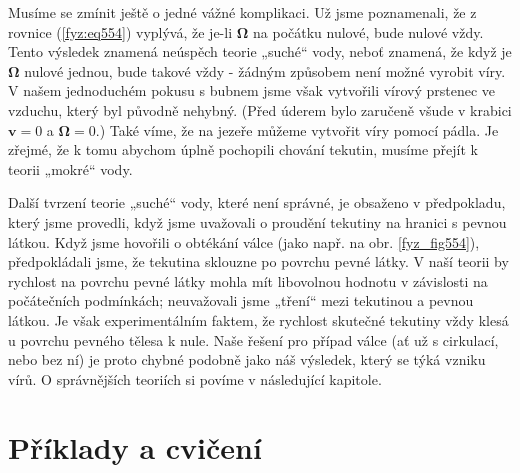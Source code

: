 {    Musíme se zmínit ještě o jedné vážné komplikaci. Už jsme poznamenali, že z rovnice 
    (\ref{fyz:eq554}) vyplývá, že je-li \(\symbf{\Omega}\) na počátku nulové, bude nulové vždy. 
    Tento výsledek znamená neúspěch teorie „suché“ vody, neboť znamená, že když je 
    \(\symbf{\Omega}\) nulové jednou, bude takové vždy - žádným způsobem není možné vyrobit víry. V 
    našem jednoduchém pokusu s bubnem jsme však vytvořili vírový prstenec ve vzduchu, který byl 
    původně nehybný. (Před úderem bylo zaručeně všude v krabici \(\bm{v} = 0\) a 
    \(\symbf{\Omega}=0\).) Také víme, že na jezeře můžeme vytvořit víry pomocí pádla. Je zřejmé, že 
    k tomu abychom úplně pochopili chování tekutin, musíme přejít k teorii „mokré“ vody.
    
    Další tvrzení teorie „suché“ vody, které není správné, je obsaženo v předpokladu, který jsme 
    provedli, když jsme uvažovali o proudění tekutiny na hranici s pevnou látkou. Když jsme 
    hovořili o obtékání válce (jako např. na obr. \ref{fyz_fig554}), předpokládali jsme, že 
    tekutina sklouzne po povrchu pevné látky. V naší teorii by rychlost na povrchu pevné látky 
    mohla mít libovolnou hodnotu v závislosti na počátečních podmínkách; neuvažovali jsme „tření“ 
    mezi tekutinou a pevnou látkou. Je však experimentálním faktem, že rychlost skutečné tekutiny 
    vždy klesá u povrchu pevného tělesa k nule. Naše řešení pro případ válce (ať už s cirkulací, 
    nebo bez ní) je proto chybné podobně jako náš výsledek, který se týká vzniku vírů. O 
    správnějších teoriích si povíme v následující kapitole.
    
  \section{Příklady a cvičení}\label{fyz:IIchapXLsecVI}
  

  
} %
\printbibliography[title={Seznam literatury},heading=subbibliography]
